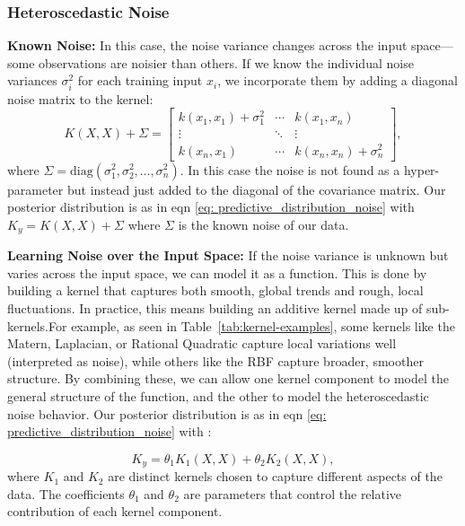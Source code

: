 \documentclass[10pt]{article}
\begin{document}
\subsubsection*{Heteroscedastic Noise}  
\textbf{Known Noise:}
%
In this case, the noise variance changes across the input space—some observations are noisier than others. If we know the individual noise variances \( \sigma_i^2 \) for each training input \( x_i \), we incorporate them by adding a diagonal noise matrix to the kernel:
\[
K(X, X) + \Sigma = 
\begin{bmatrix}
k(x_1, x_1) + \sigma_1^2 & \cdots & k(x_1, x_n) \\
\vdots & \ddots & \vdots \\
k(x_n, x_1) & \cdots & k(x_n, x_n) + \sigma_n^2
\end{bmatrix},
\]
where \( \Sigma = \text{diag}(\sigma_1^2, \sigma_2^2, \dots, \sigma_n^2) \).
In this case the noise is not found as a hyper-parameter but instead just added to the diagonal of the covariance matrix.
Our posterior distribution is as in eqn \ref{eq:  predictive_distribution_noise} with \(K_y =K(X, X) + \Sigma \) where \(\Sigma\) is the known noise of our data. 

\vspace{1em}
\noindent
\textbf{Learning Noise over the Input Space:}
%
If the noise variance is unknown but varies across the input space, we can model it as a function. 
This is done by building a kernel that captures both smooth, global trends and rough, local fluctuations. 
In practice, this means building an additive kernel made up of sub-kernels.For example, as seen in Table~\ref{tab:kernel-examples}, some kernels like the Matern, Laplacian, or Rational Quadratic capture local variations well (interpreted as noise),
while others like the RBF capture broader, smoother structure. By combining these, we can allow one kernel component to model the general structure of the function, and the other to model the heteroscedastic noise behavior. 
Our posterior distribution is as in eqn \ref{eq:  predictive_distribution_noise} with :

\begin{equation}
    K_y = \theta_1 K_1(X, X) + \theta_2 K_2(X, X),
    \label{eq:additive_kernel}
\end{equation}
where \( K_1 \) and \( K_2 \) are distinct kernels chosen to capture different aspects of the data. 
The coefficients \( \theta_1 \) and \( \theta_2 \) are parameters that control the relative contribution of each kernel component.
\end{document}
